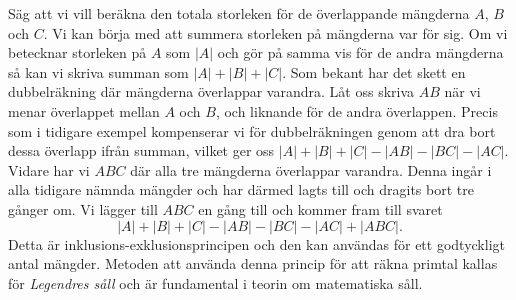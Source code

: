 Säg att vi vill beräkna den totala storleken för de överlappande mängderna $A$, $B$ och $C$. 
Vi kan börja med att summera storleken på mängderna var för sig.
Om vi betecknar storleken på $A$ som $|A|$ och gör på samma vis för de andra mängderna så kan vi skriva summan som $|A|+|B|+|C|$.
Som bekant har det skett en dubbelräkning där mängderna överlappar varandra.
Låt oss skriva $AB$ när vi menar överlappet mellan $A$ och $B$, och liknande för de andra överlappen.
Precis som i tidigare exempel kompenserar vi för dubbelräkningen genom att dra bort dessa överlapp ifrån summan, vilket ger oss $|A|+|B|+|C|-|AB|-|BC|-|AC|$.
Vidare har vi $ABC$ där alla tre mängderna överlappar varandra.
Denna ingår i alla tidigare nämnda mängder och har därmed lagts till och dragits bort tre gånger om. 
Vi lägger till $ABC$ en gång till och kommer fram till svaret
\begin{equation*}
    |A|+|B|+|C|-|AB|-|BC|-|AC|+|ABC|.
\end{equation*}
Detta är inklusions-exklusionsprincipen och den kan användas för ett godtyckligt antal mängder.
Metoden att använda denna princip för att räkna primtal kallas för \textit{Legendres såll} och är fundamental i teorin om matematiska såll.


